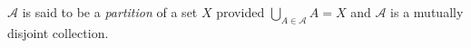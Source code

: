 \guard




\begin{defn}
\label{defn:partition}
  $\mathcal{A}$ is said to be a \emph{partition} of a set $X$ provided $\bigcup_{A\in\mathcal{A}} A = X$ and $\mathcal{A}$ is a mutually disjoint collection.
\end{defn}
